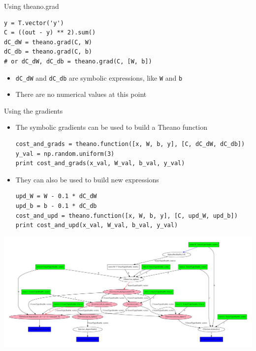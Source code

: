 \documentclass[a4paper,9pt]{beamer}
\begin{document}
\begin{frame}[fragile]{Using theano.grad}
  \begin{verbatim}
y = T.vector('y')
C = ((out - y) ** 2).sum()
dC_dW = theano.grad(C, W)
dC_db = theano.grad(C, b)
# or dC_dW, dC_db = theano.grad(C, [W, b])
  \end{verbatim}
  \begin{itemize}
    \item \verb|dC_dW| and \verb|dC_db| are symbolic expressions, like \verb|W| and \verb|b|
    \item There are no numerical values at this point
  \end{itemize}
\end{frame}

\begin{frame}[fragile]{Using the gradients}
  \begin{itemize}
    \item The symbolic gradients can be used to build a Theano function
      \begin{verbatim}
cost_and_grads = theano.function([x, W, b, y], [C, dC_dW, dC_db])
y_val = np.random.uniform(3)
print cost_and_grads(x_val, W_val, b_val, y_val)
      \end{verbatim}
    \item They can also be used to build new expressions
      \begin{verbatim}
upd_W = W - 0.1 * dC_dW
upd_b = b - 0.1 * dC_db
cost_and_upd = theano.function([x, W, b, y], [C, upd_W, upd_b])
print cost_and_upd(x_val, W_val, b_val, y_val)
      \end{verbatim}
  \end{itemize}
\end{frame}

\begin{frame}
  \includegraphics[width=\textwidth]{pydotprint_cost_and_upd.pdf}
\end{frame}
\end{document}
